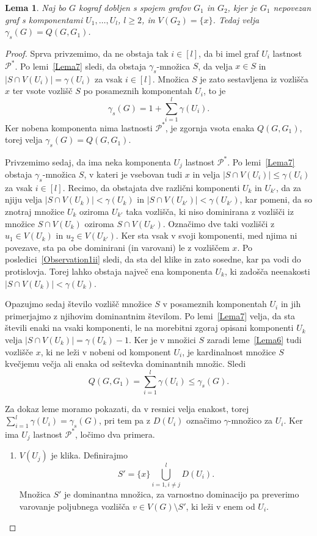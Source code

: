 \documentclass[12pt,a4paper,twoside]{article}
\theoremstyle{definition} %
\theoremstyle{plain} %
\newtheorem{lema}[definicija]{Lema}
\numberwithin{equation}{section}  %
\begin{document}
\begin{lema}\label{Lema8}
Naj bo $G$ kograf dobljen s spojem grafov $G_1$ in $G_2$, kjer je $G_1$ nepovezan graf s komponentami $U_1, \dots, U_l$, $l \geq 2$, in  $V(G_2) = \{x\}$. Tedaj velja $\gamma_s(G) = Q(G, G_1)$.
\end{lema}
\begin{proof}
Sprva privzemimo, da ne obstaja tak $i \in [l]$, da bi imel graf $U_i$ lastnost $\mathcal{P^*}$. Po lemi~\ref{Lema7} sledi, da obstaja $\gamma_s$-množica $S$, da velja $x\in S$ in $|S \cap V(U_i)| = \gamma(U_i)$ za vsak $i \in [l]$. Množica $S$ je zato sestavljena iz vozlišča $x$ ter vsote vozlišč $S$ po posameznih komponentah $U_i$, to je $$\gamma_s(G) = 1 + \sum\limits_{i=1}^l\gamma(U_i).$$ Ker nobena komponenta nima lastnosti $\mathcal{P^*}$, je zgornja vsota enaka $Q(G, G_1)$, torej velja $\gamma_s(G) = Q(G, G_1)$.

Privzemimo sedaj, da ima neka komponenta $U_j$ lastnost $\mathcal{P^*}$. Po lemi~\ref{Lema7} obstaja $\gamma_s$-množica $S$, v kateri je vsebovan tudi $x$ in velja $|S \cap V(U_i)| \leq \gamma(U_i)$ za vsak $i \in [l]$. Recimo, da obstajata dve različni komponenti $U_k$ in $U_{k'}$, da za njiju velja  $|S \cap V(U_k)| < \gamma(U_k)$ in $|S \cap V(U_{k'})| < \gamma(U_{k'})$, kar pomeni, da so znotraj množice $U_k$ oziroma $U_{k'}$ taka vozlišča, ki niso dominirana z vozlišči iz množice $S \cap V(U_k)$ oziroma $S \cap V(U_{k'})$. Označimo dve taki vozlišči z $u_1\in V(U_k)$ in $u_2 \in V(U_{k'})$. Ker sta vsak v svoji komponenti, med njima ni povezave, sta pa obe dominirani (in varovani) le z vozliščem $x$. Po posledici~\ref{Observation1ii} sledi, da sta del klike in zato sosedne, kar pa vodi do protislovja. Torej lahko obstaja največ ena komponenta $U_k$, ki zadošča neenakosti $|S \cap V(U_k)| < \gamma(U_k)$.

Opazujmo sedaj število vozlišč množice $S$ v posameznih komponentah $U_i$ in jih primerjajmo z njihovim dominantnim številom. Po lemi~\ref{Lema7} velja, da sta števili enaki na vsaki komponenti, le na morebitni zgoraj opisani komponenti $U_k$ velja $|S \cap V(U_k)| = \gamma(U_k) - 1$. Ker je v množici $S$ zaradi leme~\ref{Lema6} tudi vozlišče $x$, ki ne leži v nobeni od komponent $U_i$, je kardinalnost množice $S$ kvečjemu večja ali enaka od seštevka dominantnih množic. Sledi $$Q(G, G_1) = \sum\limits_{i = 1}^l\gamma(U_i) \leq \gamma_s(G).$$

Za dokaz leme moramo pokazati, da v resnici velja enakost, torej $\sum_{i = 1}^l\gamma(U_i) = \gamma_s(G)$, pri tem pa z $D(U_i)$ označimo $\gamma$-množico za $U_i$. Ker ima $U_j$ lastnost $\mathcal{P^*}$, ločimo dva primera.
\begin{enumerate}[label=($\roman*$)]
\item $V(U_j)$ je klika. Definirajmo $$S' = \{x\} \bigcup\limits_{i = 1, i \neq j}^l D(U_i).$$
Množica $S'$ je dominantna množica, za varnostno dominacijo pa preverimo varovanje poljubnega vozlišča $v \in V(G) \setminus S'$, ki leži v enem od $U_i$.


\end{enumerate}
\end{proof}
\end{document}
